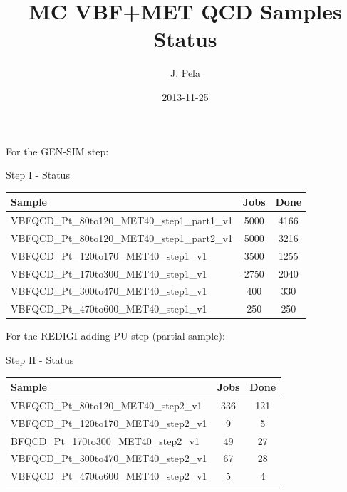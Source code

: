\documentclass[8pt]{beamer}
\author[João Pela]{J. Pela}
\title[]{MC VBF+MET QCD Samples Status}
\institute{Imperial College London}
\date{2013-11-25}
\begin{document}
\setlength{\unitlength}{1mm}

\begin{frame}
  \titlepage
\end{frame}

\begin{frame}

For the GEN-SIM step:
\begin{block}{Step I - Status}
 
\centering
\begin{tabular}{|l||c|c|}
\hline
Sample          & Jobs & Done \\
\hline \hline
VBFQCD\_Pt\_80to120\_MET40\_step1\_part1\_v1 & 5000 & 4166 \\
VBFQCD\_Pt\_80to120\_MET40\_step1\_part2\_v1 & 5000 & 3216 \\
VBFQCD\_Pt\_120to170\_MET40\_step1\_v1      & 3500 & 1255 \\
VBFQCD\_Pt\_170to300\_MET40\_step1\_v1      & 2750 & 2040 \\
VBFQCD\_Pt\_300to470\_MET40\_step1\_v1      &  400 &  330 \\
VBFQCD\_Pt\_470to600\_MET40\_step1\_v1      &  250 &  250 \\
\hline
\end{tabular}

\end{block}

For the REDIGI adding PU step (partial sample):
\begin{block}{Step II - Status}
 
\centering
\begin{tabular}{|l||c|c|}
\hline
Sample          & Jobs & Done \\
\hline \hline
VBFQCD\_Pt\_80to120\_MET40\_step2\_v1  & 336 & 121 \\
VBFQCD\_Pt\_120to170\_MET40\_step2\_v1 &   9 &   5 \\
BFQCD\_Pt\_170to300\_MET40\_step2\_v1  &  49 &  27 \\
VBFQCD\_Pt\_300to470\_MET40\_step2\_v1 &  67 &  28 \\
VBFQCD\_Pt\_470to600\_MET40\_step2\_v1 &   5 &   4 \\
\hline
\end{tabular}

\end{block}

\end{frame}
\end{document}
